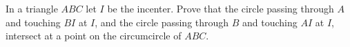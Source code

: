In a triangle $ABC$ let $I$ be the incenter. Prove that the circle passing through $A$ and touching $BI$ at $I$, and the circle passing through $B$ and touching $AI$ at $I$, intersect at a point on the circumcircle of $ABC$.